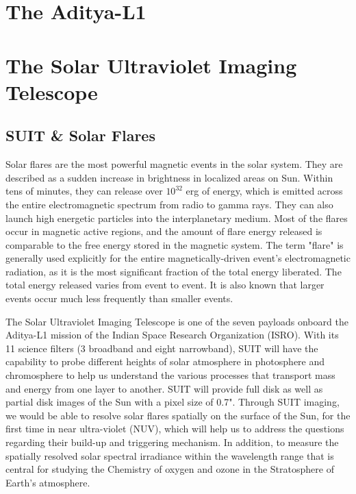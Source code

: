 
\section{The Aditya-L1}

\section{The Solar Ultraviolet Imaging Telescope}

\subsection{SUIT \& Solar Flares}\label{sec:suit_and_flare}

Solar flares are the most powerful magnetic events in the solar system. They are described as a sudden increase in brightness in localized areas on Sun. Within tens of minutes, they can release over $10^{32}$ erg of energy, which is emitted across the entire electromagnetic spectrum from radio to gamma rays. They can also launch high energetic particles into the interplanetary medium. Most of the flares occur in magnetic active regions, and the amount of flare energy released is comparable to the free energy stored in the magnetic system. The term "flare" is generally used explicitly for the entire magnetically-driven event's electromagnetic radiation, as it is the most significant fraction of the total energy liberated. The total energy released varies from event to event. It is also known that larger events occur much less frequently than smaller events.

The Solar Ultraviolet Imaging Telescope \citep[SUIT;][]{ghosh16,article} is one of the seven payloads onboard the Aditya-L1 mission \citep{adityal1} of the Indian Space Research Organization (ISRO). With its 11 science filters (3 broadband and eight narrowband), SUIT will have the capability to probe different heights of solar atmosphere in photosphere and chromosphere to help us understand the various processes that transport mass and energy from one layer to another. SUIT will provide full disk as well as partial disk images of the Sun with a pixel size of 0.7". Through SUIT imaging, we would be able to resolve solar flares spatially on the surface of the Sun, for the first time in near ultra-violet (NUV), which will help us to address the questions regarding their build-up and triggering mechanism. In addition, to measure the spatially resolved solar spectral irradiance within the wavelength range that is central for studying the Chemistry of oxygen and ozone in the Stratosphere of Earth's atmosphere.


